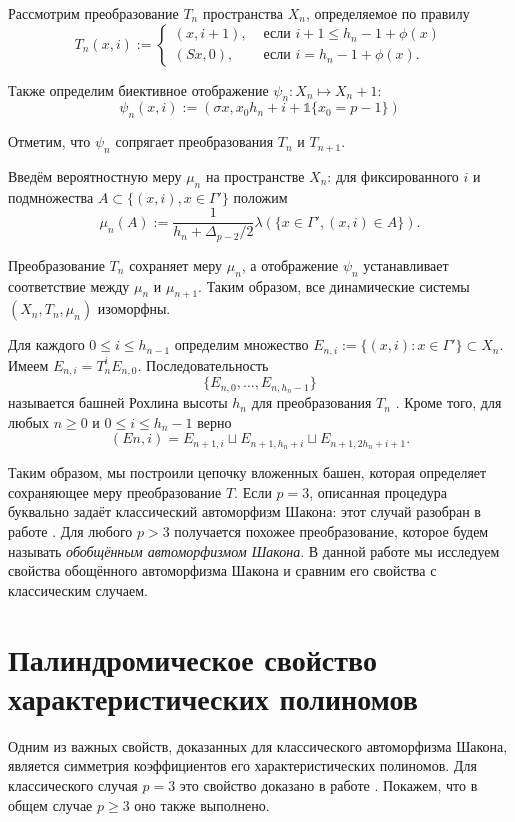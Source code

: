 \documentclass[14pt, a4paper, russian]{report}
\begin{document}
Рассмотрим преобразование $T_n$ пространства $X_n$, определяемое по правилу
$$T_n(x, i) := \begin{cases}
(x,i+1), & \text{ если } i+1 \le h_n - 1 + \phi(x) \\
(Sx,0), & \text{ если } i=h_n-1+\phi(x). \end{cases}$$

Также определим биективное отображение $\psi_n : X_n \mapsto X_n+1$:
$$\psi_n(x,i):=(\sigma x, x_0 h_n + i + \mathbb{1}\{x_0=p-1\})$$

Отметим, что $\psi_n$ сопрягает преобразования $T_n$ и
$T_{n+1}$.

Введём вероятностную меру $\mu_n$ на пространстве $X_n$: для фиксированного $i$ и подмножества
$A \subset \{(x, i), x\in\Gamma' \}$ положим
$$\mu_n(A):=\frac{1}{h_n + \Delta_{p-2}/2} \lambda (\{x \in \Gamma', (x, i) \in A\}).$$

Преобразование $T_n$ сохраняет меру $\mu_n$, а отображение $\psi_n$ устанавливает соответствие между $\mu_n$ и $\mu_{n+1}$. Таким образом, все динамические системы $(X_n, T_n, \mu_n)$ изоморфны.

Для каждого $ 0 \le i \le h_{n-1}$ определим множество
$E_{n,i} := \{(x, i) : x \in \Gamma'\} \subset X_n$. Имеем $E_{n,i} = T^i_n E_{n,0}$. Последовательность
 $$\{E_{n,0},\ldots,E_{n,h_n-1}\}$$
называется башней Рохлина высоты $h_n$ для преобразования $T_n$ \cite{rokhlin_towers}. Кроме того, для любых $n \ge 0$ и $0 \le i \le h_n-1$ верно 
\begin{equation}\label{eq:embedding}
(En,i) = E_{n+1,i} \sqcup E_{n+1,h_n+i} \sqcup E_{n+1,2h_n+i+1}.
\end{equation}

Таким образом, мы построили цепочку вложенных башен, которая определяет сохраняющее меру преобразование $T$. Если $p=3$, описанная процедура буквально задаёт классический автоморфизм Шакона: этот случай разобран в работе \cite{weaklimits}. Для любого $p > 3$ получается похожее преобразование, которое будем называть \emph{обобщённым автоморфизмом Шакона}. В данной работе мы исследуем свойства обощённого автоморфизма Шакона и сравним его свойства с классическим случаем.

\chapter{Палиндромическое свойство характеристических полиномов}
Одним из важных свойств, доказанных для классического автоморфизма Шакона, является симметрия коэффициентов его характеристических полиномов. Для классического случая $p=3$  это свойство доказано в работе \cite{weaklimits}. Покажем, что в общем случае $p \ge 3$ оно также выполнено.
\end{document}
